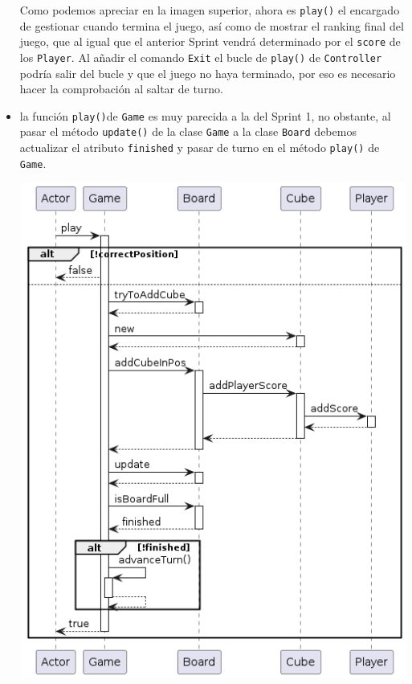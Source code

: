 \documentclass[../DocumentoOficial.tex]{subfiles}
\begin{document}
\begin{sprint}[2]
\begin{itemize}
\begin{center}
\end{center}
Como podemos apreciar en la imagen superior, ahora es \texttt{play()} el encargado de gestionar cuando termina el juego, así como de mostrar el ranking final del juego, que al igual que el anterior Sprint vendrá determinado por el \texttt{score} de los \texttt{Player}. Al añadir el comando \texttt{Exit} el bucle de \texttt{play()} de \texttt{Controller} podría salir del bucle y que el juego no haya terminado, por eso es necesario hacer la comprobación al saltar de turno.

\item la función \texttt{play()}de \texttt{Game} es muy parecida a la del Sprint 1, no obstante, al pasar el método \texttt{update()} de la clase \texttt{Game} a la clase \texttt{Board} debemos actualizar el atributo \texttt{finished} y pasar de turno en el método \texttt{play()} de \texttt{Game}. 
\begin{center}
\includegraphics[scale=0.57]{playgameS2.png}
\end{center}


\end{itemize}
\end{sprint}
\end{document}
